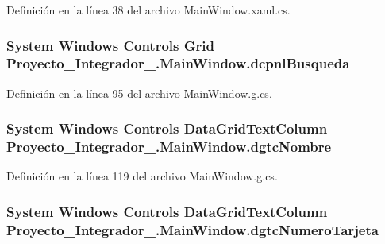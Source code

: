Definición en la línea 38 del archivo Main\-Window.\-xaml.\-cs.

\hypertarget{class_proyecto___integrador__3_1_1_main_window_a41eb8f3098c61c6e0dcf936594c033d4}{
\subsubsection[{dcpnl\-Busqueda}]{\setlength{\rightskip}{0pt plus 5cm}System Windows Controls Grid Proyecto\-\_\-\-Integrador\-\_.\-Main\-Window.\-dcpnl\-Busqueda\hspace{0.3cm}{\ttfamily [package]}}}\label{class_proyecto___integrador__3_1_1_main_window_a41eb8f3098c61c6e0dcf936594c033d4}


Definición en la línea 95 del archivo Main\-Window.\-g.\-cs.

\hypertarget{class_proyecto___integrador__3_1_1_main_window_a867d58258d7e2baa1b4d446dda2f2c51}{
\subsubsection[{dgtc\-Nombre}]{\setlength{\rightskip}{0pt plus 5cm}System Windows Controls Data\-Grid\-Text\-Column Proyecto\-\_\-\-Integrador\-\_.\-Main\-Window.\-dgtc\-Nombre\hspace{0.3cm}{\ttfamily [package]}}}\label{class_proyecto___integrador__3_1_1_main_window_a867d58258d7e2baa1b4d446dda2f2c51}


Definición en la línea 119 del archivo Main\-Window.\-g.\-cs.

\hypertarget{class_proyecto___integrador__3_1_1_main_window_ab28b60d43c765aa3cf2dc7c64e56f8c7}{
\subsubsection[{dgtc\-Numero\-Tarjeta}]{\setlength{\rightskip}{0pt plus 5cm}System Windows Controls Data\-Grid\-Text\-Column Proyecto\-\_\-\-Integrador\-\_.\-Main\-Window.\-dgtc\-Numero\-Tarjeta\hspace{0.3cm}{\ttfamily [package]}}}\label{class_proyecto___integrador__3_1_1_main_window_ab28b60d43c765aa3cf2dc7c64e56f8c7}


